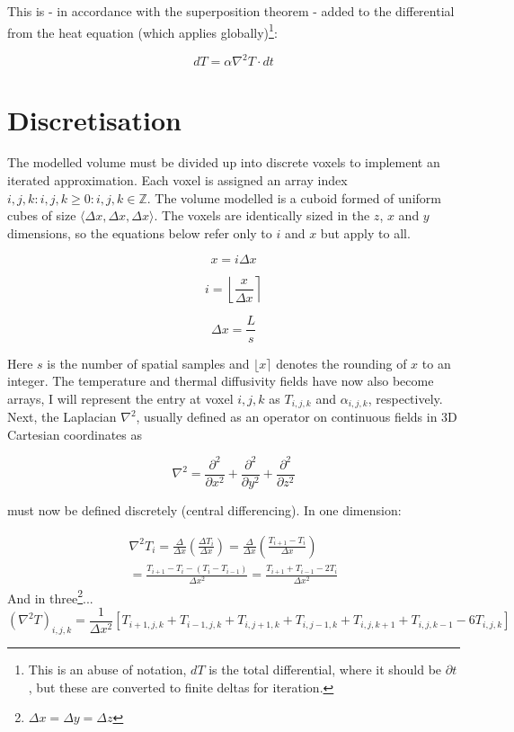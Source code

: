 \documentclass{article}
\begin{document}
This is - in accordance with the superposition theorem - added to the differential from the heat equation (which applies globally)\footnote{This is an abuse of notation, $dT$ is the total differential, where it should be $\partial t$, but these are converted to finite deltas for iteration.}:

\begin{equation}
    dT = \alpha \nabla^2T\cdot dt
\end{equation}

\section{Discretisation}
The modelled volume must be divided up into discrete voxels to implement an iterated approximation. Each voxel is assigned an array index $i,j,k: i,j,k\geq 0: i,j,k \in \mathbb{Z}$. The volume modelled is a cuboid formed of uniform cubes of size $\langle \Delta x,\Delta x,\Delta x\rangle$. The voxels are identically sized in the $z$, $x$ and $y$ dimensions, so the equations below refer only to $i$ and $x$ but apply to all.

\begin{equation}
    x = i\Delta x
\end{equation}

\begin{equation}
    i = \left\lfloor \frac{x}{\Delta x} \right\rceil
\end{equation}

\begin{equation}
    \Delta x = \frac{L}{s}
\end{equation}

Here $s$ is the number of spatial samples and $\lfloor x \rceil$ denotes the rounding of $x$ to an integer. The temperature and thermal diffusivity fields have now also become arrays, I will represent the entry at voxel $i,j,k$ as $T_{i,j,k}$ and $\alpha_{i,j,k}$, respectively. Next, the Laplacian $\nabla^2$, usually defined as an operator on continuous fields in 3D Cartesian coordinates as

\begin{equation}
    \nabla^2 = \frac{\partial^2}{\partial x^2}+\frac{\partial^2}{\partial y^2}+\frac{\partial^2}{\partial z^2}
\end{equation}

must now be defined discretely (central differencing). In one dimension:

\begin{equation}
\begin{split}
    \nabla^2T_{i} = \frac{\Delta}{\Delta x}\left(\frac{\Delta T_{i}}{\Delta x}\right) = \frac{\Delta}{\Delta x}\left(\frac{T_{i+1}-T_{i}}{\Delta x}\right) \\ = \frac{T_{i+1}-T_{i}-(T_{i}-T_{i-1})}{\Delta x^2} = \frac{T_{i+1}+T_{i-1}-2T_{i}}{\Delta x^2}
\end{split}
\end{equation}
And in three\footnote{$\Delta x = \Delta y = \Delta z$}...
\begin{equation}
    (\nabla^2T)_{i,j,k} = \frac{1}{\Delta x^2}[T_{i+1,j,k}+T_{i-1,j,k}+T_{i,j+1,k}+T_{i,j-1,k}+T_{i,j,k+1}+T_{i,j,k-1}-6T_{i,j,k}]
\end{equation}
\end{document}

